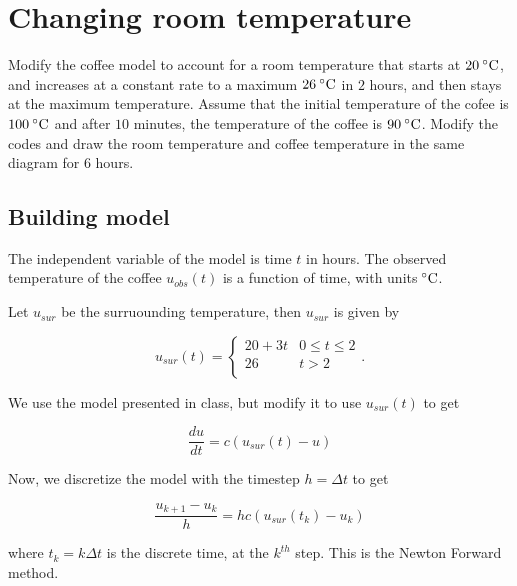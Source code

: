 \documentclass[11pt,oneside]{extarticle}
\newcommand{\Celsius}{\:\degree\mathrm{C}}
\numberwithin{equation}{section}
\numberwithin{figure}{section}
\begin{document}
\section{Changing room temperature}

\par Modify the coffee model to account for a room temperature that starts at $20\Celsius$,
and increases at a constant rate to a maximum $26\Celsius$ in $2$ hours, and then
stays at the maximum temperature. Assume that the initial temperature of the cofee
is $100\Celsius$ and after $10$ minutes, the temperature of the coffee is $90\Celsius$.
Modify the codes and draw the room temperature and coffee temperature in the same
diagram for $6$ hours.

\subsection{Building model}

\par The independent variable of the model is time $t$ in hours. The observed temperature
of the coffee $u_{obs}(t)$ is a function of time, with units$\Celsius$.

\par Let $u_{sur}$ be the surruounding temperature, then $u_{sur}$ is given by

\begin{equation}
    u_{sur}(t) = 
    \begin{cases} 
        20 + 3t & 0 \leq t \leq 2 \\
        26 & t > 2 \\
    \end{cases}.
\end{equation}

\par We use the model presented in class, but modify it to use $u_{sur}(t)$ to
get 

\begin{equation}
    \frac{du}{dt}
    =
    c(u_{sur}(t)-u)
\end{equation}

Now, we discretize the model with the timestep $h=\Delta t$ to get

\begin{equation}
    \frac{u_{k+1} - u_k}{h}
    =
    hc(u_{sur}(t_k) - u_k)
\end{equation}

where $t_k = k\Delta t$ is the discrete time, at the $k^{th}$ step. This is the
Newton Forward method.
\end{document}
